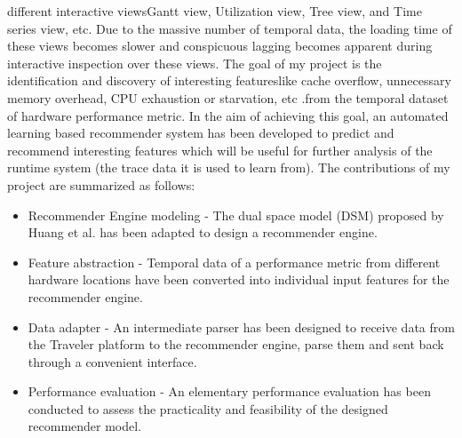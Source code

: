 different interactive views\textemdash Gantt view, Utilization view, Tree view, and Time series view, etc. Due to the massive number of temporal data, the
loading time of these views becomes slower and conspicuous lagging becomes apparent during interactive inspection over these views. The goal of my project is
the identification and discovery of interesting features\textemdash like cache overflow, unnecessary memory overhead, CPU exhaustion or starvation,
etc .\textemdash from the temporal dataset of hardware performance metric. In the aim of achieving this goal, an automated learning based recommender system
has been developed to predict and recommend interesting features which will be useful for further analysis of the runtime system (the trace data it is used
to learn from). The contributions of my project are summarized as follows:
\begin{itemize}
    \item Recommender Engine modeling - The dual space model (DSM)\cite{huang2018optimization} proposed by Huang et al. has been adapted to design a
    recommender engine.
    \item Feature abstraction - Temporal data of a performance metric from different hardware locations have been converted into individual input features for
    the recommender engine.
    \item Data adapter - An intermediate parser has been designed to receive data from the Traveler platform to the recommender engine, parse them and
    sent back through a convenient interface.
    \item Performance evaluation - An elementary performance evaluation has been conducted to assess the practicality and feasibility of the designed
    recommender model.
\end{itemize}
